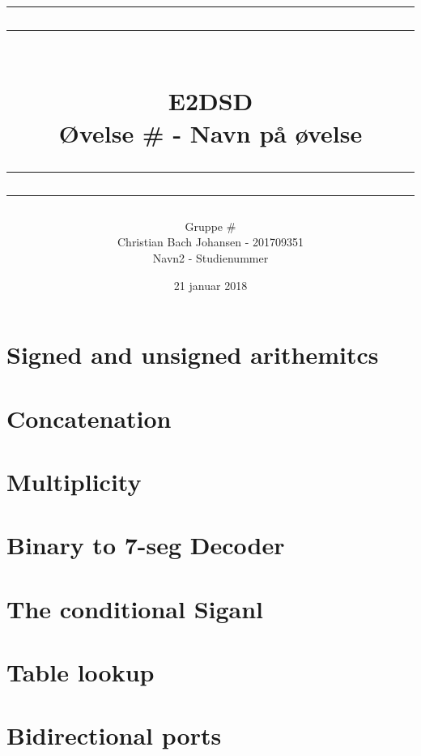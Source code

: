\documentclass[12pt,a4paper]{article}
\newcommand\mymaketitle[1]{
   \rule{\textwidth}{1.6pt}\vspace*{-\baselineskip}\vspace*{2pt}
   \rule{\textwidth}{0.4pt}
   \\  
   \huge \bf #1\\
   \vspace{-8pt}
   \rule{\textwidth}{0.4pt}\vspace*{-\baselineskip}\vspace{3.2pt}
   \rule{\textwidth}{1.6pt}
}
\begin{document}
\title{
	\mymaketitle{E2DSD\\Øvelse \# - Navn på øvelse}
}
\author{
	Gruppe \#\\
	Christian Bach Johansen - 201709351\\
	Navn2 - Studienummer
}
\date{21 januar 2018}

\maketitle



\section{Signed and unsigned arithemitcs}

\newpage

\section{Concatenation}


\section{Multiplicity}


\section{Binary to 7-seg Decoder}


\section{The conditional Siganl}


\section{Table lookup}


\section{Bidirectional ports}

\end{document}
